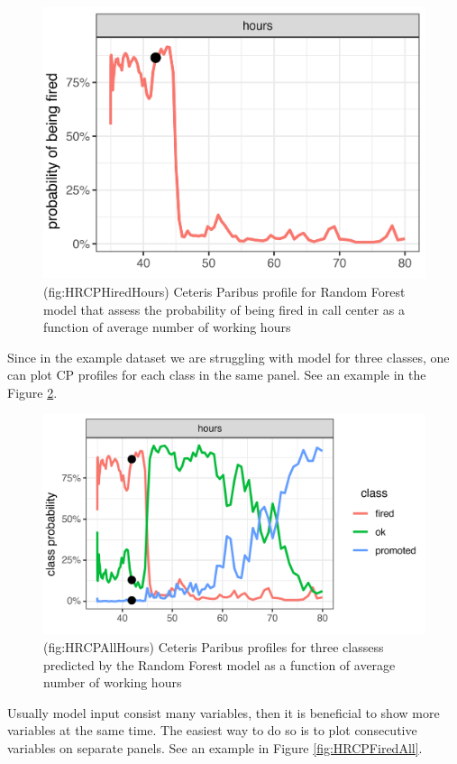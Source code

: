 \documentclass[]{krantz}
\theoremstyle{definition}
\theoremstyle{definition}
\theoremstyle{definition}
\theoremstyle{remark}
\begin{document}
\begin{figure}

{\centering \includegraphics[width=0.5\linewidth]{figure/HR_cp_fired_hours} 

}

\caption{(fig:HRCPHiredHours) Ceteris Paribus profile for Random Forest model that assess the probability of being fired in call center as a function of average number of working hours}\label{fig:HRCPFiredHours}
\end{figure}

Since in the example dataset we are struggling with model for three
classes, one can plot CP profiles for each class in the same panel. See
an example in the Figure \ref{fig:HRCPAllHours}.

\begin{figure}

{\centering \includegraphics[width=0.6\linewidth]{figure/HR_cp_all_hours} 

}

\caption{(fig:HRCPAllHours) Ceteris Paribus profiles for three classess predicted by the Random Forest model as a function of average number of working hours}\label{fig:HRCPAllHours}
\end{figure}

Usually model input consist many variables, then it is beneficial to
show more variables at the same time. The easiest way to do so is to
plot consecutive variables on separate panels. See an example in Figure
\ref{fig:HRCPFiredAll}.
\end{document}

